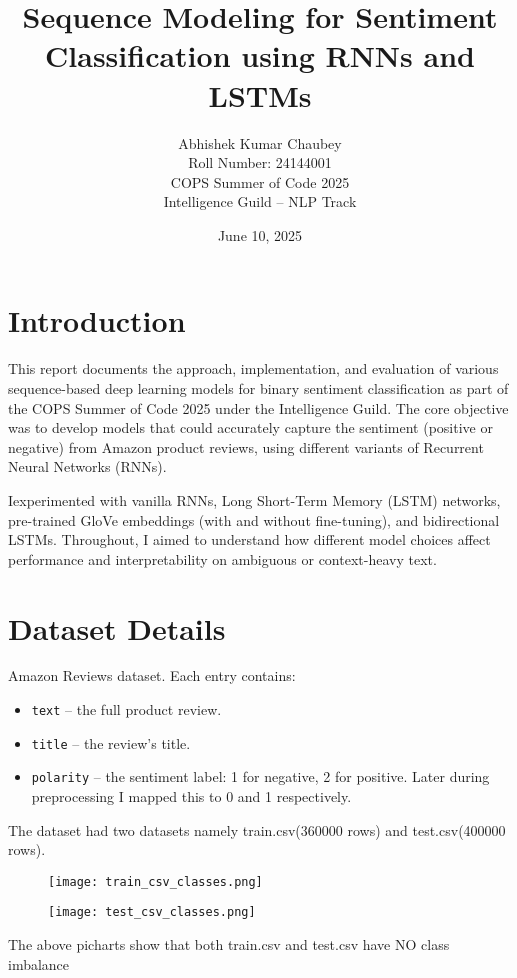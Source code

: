 \documentclass[12pt]{article}
\title{\textbf{Sequence Modeling for Sentiment Classification using RNNs and LSTMs}}
\author{Abhishek Kumar Chaubey \\
Roll Number: 24144001 \\
COPS Summer of Code 2025 \\
Intelligence Guild – NLP Track}
\date{June 10, 2025}
\begin{document}
\maketitle

\tableofcontents
\newpage

\section{Introduction}
This report documents the approach, implementation, and evaluation of various sequence-based deep learning models for binary sentiment classification as part of the COPS Summer of Code 2025 under the Intelligence Guild. The core objective was to develop models that could accurately capture the sentiment (positive or negative) from Amazon product reviews, using different variants of Recurrent Neural Networks (RNNs).

Iexperimented with vanilla RNNs, Long Short-Term Memory (LSTM) networks, pre-trained GloVe embeddings (with and without fine-tuning), and bidirectional LSTMs. Throughout, I aimed to understand how different model choices affect performance and interpretability on ambiguous or context-heavy text.

\section{Dataset Details}
Amazon Reviews dataset. Each entry contains:

\begin{itemize}
    \item \texttt{text} – the full product review.
    \item \texttt{title} – the review's title.
    \item \texttt{polarity} – the sentiment label: 1 for negative, 2 for positive. Later during preprocessing I mapped this to 0 and 1 respectively.
\end{itemize}

The dataset had two datasets namely train.csv(360000 rows) and test.csv(400000 rows).
\begin{figure}[H]
    \centering
    \texttt{[image: train\_csv\_classes.png]}
\end{figure}
\begin{figure}[H]
    \centering
    \texttt{[image: test\_csv\_classes.png]}
\end{figure}
The above picharts show that both train.csv and test.csv have NO class imbalance
\end{document}
